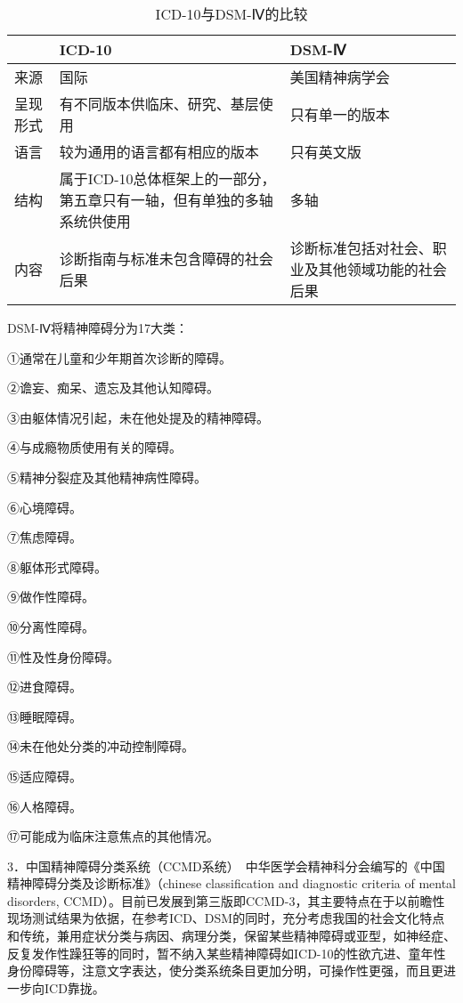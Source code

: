 \begin{table}[ht]
    \caption{ICD-10与DSM-Ⅳ的比较}
    \label{tab2-1}
    \centering
    \begin{tabular}{lp{5cm}p{5cm}}
    \toprule
    & ICD-10 & DSM-Ⅳ \\
    \midrule
    来源 & 国际 & 美国精神病学会\\
    呈现形式 & 有不同版本供临床、研究、基层使用 &
    只有单一的版本\\
    语言 & 较为通用的语言都有相应的版本 & 只有英文版\\
    结构 & 属于ICD-10总体框架上的一部分，第五章只有一轴，但有单独的多轴系统供使用 &
    多轴\\
    内容 & 诊断指南与标准未包含障碍的社会后果 & 诊断标准包括对社会、职业及其他领域功能的社会后果\\
    \bottomrule
    \end{tabular}
  \end{table}

DSM-Ⅳ将精神障碍分为17大类：

①通常在儿童和少年期首次诊断的障碍。

②谵妄、痴呆、遗忘及其他认知障碍。

③由躯体情况引起，未在他处提及的精神障碍。

④与成瘾物质使用有关的障碍。

⑤精神分裂症及其他精神病性障碍。

⑥心境障碍。

⑦焦虑障碍。

⑧躯体形式障碍。

⑨做作性障碍。

⑩分离性障碍。

⑪性及性身份障碍。

⑫进食障碍。

⑬睡眠障碍。

⑭未在他处分类的冲动控制障碍。

⑮适应障碍。

⑯人格障碍。

⑰可能成为临床注意焦点的其他情况。

3．中国精神障碍分类系统（CCMD系统）　中华医学会精神科分会编写的《中国精神障碍分类及诊断标准》（chinese
classification and diagnostic criteria of mental disorders,
CCMD）。目前已发展到第三版即CCMD-3，其主要特点在于以前瞻性现场测试结果为依据，在参考ICD、DSM的同时，充分考虑我国的社会文化特点和传统，兼用症状分类与病因、病理分类，保留某些精神障碍或亚型，如神经症、反复发作性躁狂等的同时，暂不纳入某些精神障碍如ICD-10的性欲亢进、童年性身份障碍等，注意文字表达，使分类系统条目更加分明，可操作性更强，而且更进一步向ICD靠拢。

